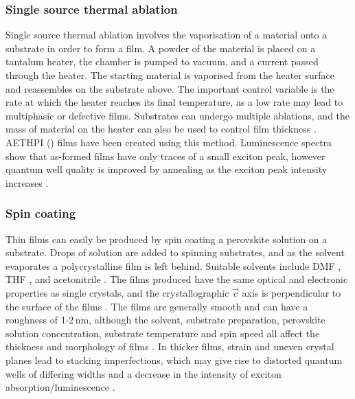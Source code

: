 \subsubsection{Single source thermal ablation}
Single source thermal ablation involves the vaporisation of a material onto a substrate in order to form a film. A powder of the material is placed on a tantalum heater, the chamber is pumped to vacuum, and a current passed through the heater. The starting material is vaporised from the heater surface and reassembles on the substrate above. The important control variable is the rate at which the heater reaches its final temperature, as a low rate may lead to multiphasic or defective films. Substrates can undergo multiple ablations, and the mass of material on the heater can also be used to control film thickness \cite{Mitzi1999}. AETHPI () films have been created using this method. Luminescence spectra show that as-formed films have only traces of a small exciton peak, however quantum well quality is improved by annealing as the exciton peak intensity increases \cite{Chondroudis2000}.

\subsubsection{Spin coating}
Thin films can easily be produced by spin coating a perovskite solution on a substrate. Drops of solution are added to spinning substrates, and as the solvent evaporates a polycrystalline film is left behind. Suitable solvents include DMF \cite{Kikuchi2005}, THF \cite{Kataoka1994}, and acetonitrile \cite{VijayaPrakash2009}. The films produced have the same optical and electronic properties as single crystals, and the crystallographic $\vec{c}$ axis is perpendicular to the surface of the films \cite{Kataoka1993}. The films are generally smooth and can have a roughness of 1-2\,nm, although the solvent, substrate preparation, perovskite solution concentration, substrate temperature and spin speed all affect the thickness and morphology of films \cite{Mitzi2001b}. In thicker films, strain and uneven crystal planes lead to stacking imperfections, which may give rise to distorted quantum wells of differing widths and a decrease in the intensity of exciton absorption/luminescence \cite{VijayaPrakash2009}.

